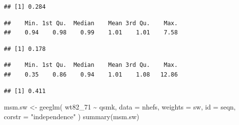 \documentclass[
  10pt,
]{book}
\newenvironment{Shaded}{\begin{snugshade}}{\end{snugshade}}
\newcommand{\AttributeTok}[1]{\textcolor[rgb]{0.77,0.63,0.00}{#1}}
\newcommand{\FunctionTok}[1]{\textcolor[rgb]{0.00,0.00,0.00}{#1}}
\newcommand{\NormalTok}[1]{#1}
\newcommand{\OtherTok}[1]{\textcolor[rgb]{0.56,0.35,0.01}{#1}}
\newcommand{\SpecialCharTok}[1]{\textcolor[rgb]{0.00,0.00,0.00}{#1}}
\newcommand{\StringTok}[1]{\textcolor[rgb]{0.31,0.60,0.02}{#1}}
\begin{document}
\begin{verbatim}
## [1] 0.284
\end{verbatim}

\begin{Shaded}
\end{Shaded}

\begin{verbatim}
##    Min. 1st Qu.  Median    Mean 3rd Qu.    Max. 
##    0.94    0.98    0.99    1.01    1.01    7.58
\end{verbatim}

\begin{Shaded}
\end{Shaded}

\begin{verbatim}
## [1] 0.178
\end{verbatim}

\begin{Shaded}
\end{Shaded}

\begin{verbatim}
##    Min. 1st Qu.  Median    Mean 3rd Qu.    Max. 
##    0.35    0.86    0.94    1.01    1.08   12.86
\end{verbatim}

\begin{Shaded}
\end{Shaded}

\begin{verbatim}
## [1] 0.411
\end{verbatim}

\begin{Shaded}
\begin{Highlighting}[]
\NormalTok{msm.sw }\OtherTok{\textless{}{-}} \FunctionTok{geeglm}\NormalTok{(}
\NormalTok{  wt82\_71 }\SpecialCharTok{\textasciitilde{}}\NormalTok{ qsmk,}
  \AttributeTok{data =}\NormalTok{ nhefs,}
  \AttributeTok{weights =}\NormalTok{ sw,}
  \AttributeTok{id =}\NormalTok{ seqn,}
  \AttributeTok{corstr =} \StringTok{"independence"}
\NormalTok{)}
\FunctionTok{summary}\NormalTok{(msm.sw)}
\end{Highlighting}
\end{Shaded}
\end{document}
